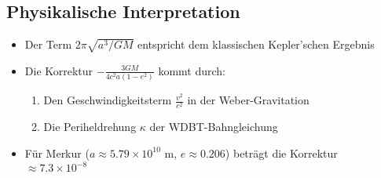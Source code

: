 \subsection*{Physikalische Interpretation}
\begin{itemize}
\item Der Term \( 2\pi \sqrt{a^3/GM} \) entspricht dem klassischen Kepler'schen Ergebnis
\item Die Korrektur \( -\frac{3GM}{4c^2 a(1-e^2)} \) kommt durch:
  \begin{enumerate}
  \item Den Geschwindigkeitsterm \( \frac{v^2}{c^2} \) in der Weber-Gravitation
  \item Die Periheldrehung \( \kappa \) der WDBT-Bahngleichung
  \end{enumerate}
\item Für Merkur (\( a \approx 5.79 \times 10^{10} \) m, \( e \approx 0.206 \)) beträgt die Korrektur \( \approx 7.3 \times 10^{-8} \)
\end{itemize}
